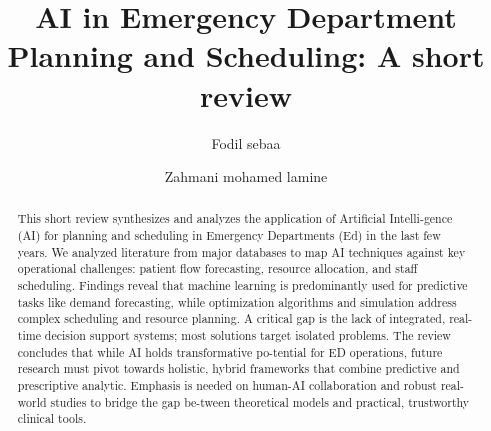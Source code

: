 \documentclass[runningheads]{llncs}
\begin{document}
\title{AI in Emergency Department Planning and Scheduling: A short review}
\author{Fodil sebaa \and Zahmani mohamed lamine}

\maketitle

\begin{abstract}
This short review synthesizes and analyzes the application of Artificial Intelli-gence (AI) for planning and scheduling in Emergency Departments (Ed) in the last few years. We analyzed literature from major databases to map AI techniques against key operational challenges: patient flow forecasting, resource allocation, and staff scheduling. Findings reveal that machine learning is predominantly used for predictive tasks like demand forecasting, while optimization algorithms and simulation address complex scheduling and resource planning. A critical gap is the lack of integrated, real-time decision support systems; most solutions target isolated problems. The review concludes that while AI holds transformative po-tential for ED operations, future research must pivot towards holistic, hybrid frameworks that combine predictive and prescriptive analytic. Emphasis is needed on human-AI collaboration and robust real-world studies to bridge the gap be-tween theoretical models and practical, trustworthy clinical tools.
\end{abstract}
\end{document}
